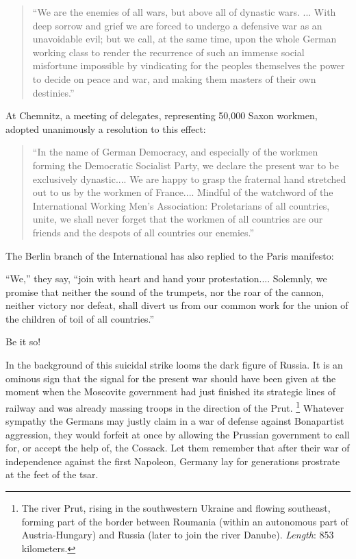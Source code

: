 \documentclass{book}
\begin{document}
\begin{quote}

``We are the enemies of all wars, but above all of dynastic wars. ... With
deep sorrow and grief we are forced to undergo a defensive war as an
unavoidable evil; but we call, at the same time, upon the whole German
working class to render the recurrence of such an immense social
misfortune impossible by vindicating for the peoples themselves the power
to decide on peace and war, and making them masters of their own
destinies.''

\end{quote}

At Chemnitz, a meeting of delegates, representing 50,000 Saxon workmen,
adopted unanimously a resolution to this effect:

\begin{quote}

``In the name of German Democracy, and especially of the workmen forming
the Democratic Socialist Party, we declare the present war to be
exclusively dynastic.... We are happy to grasp the fraternal hand
stretched out to us by the workmen of France.... Mindful of the watchword
of the International Working Men’s Association: Proletarians of all
countries, unite, we shall never forget that the workmen of all countries
are our friends and the despots of all countries our enemies.''

\end{quote}

The Berlin branch of the International has also replied to the Paris
manifesto:

``We,'' they say, ``join with heart and hand your protestation....
Solemnly, we promise that neither the sound of the trumpets, nor the roar
of the cannon, neither victory nor defeat, shall divert us from our common
work for the union of the children of toil of all countries.''

Be it so!

In the background of this suicidal strike looms the dark figure of Russia.
It is an ominous sign that the signal for the present war should have been
given at the moment when the Moscovite government had just finished its
strategic lines of railway and was already massing troops in the direction
of the Prut. \footnote{The river Prut, rising in the southwestern Ukraine
and flowing southeast, forming part of the border between Roumania (within
an autonomous part of Austria-Hungary) and Russia (later to join the river
Danube). \emph{Length}: 853 kilometers.} Whatever sympathy the Germans may
justly claim in a war of defense against Bonapartist aggression, they
would forfeit at once by allowing the Prussian government to call for, or
accept the help of, the Cossack. Let them remember that after their war of
independence against the first Napoleon, Germany lay for generations
prostrate at the feet of the tsar.
\end{document}
